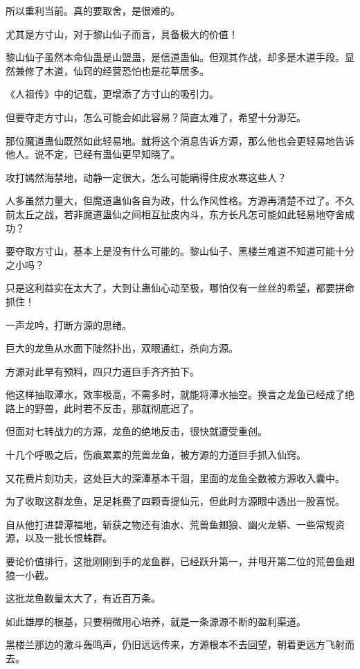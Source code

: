 \begin{this_body}
所以重利当前。真的要取舍，是很难的。

尤其是方寸山，对于黎山仙子而言，具备极大的价值！

黎山仙子虽然本命仙蛊是山盟蛊，是信道蛊仙。但观其作战，却多是木道手段。显然兼修了木道，仙窍的经营恐怕也是花草居多。

《人祖传》中的记载，更增添了方寸山的吸引力。

但要夺走方寸山，怎么可能会如此容易？简直太难了，希望十分渺茫。

那位魔道蛊仙既然如此轻易地。就将这个消息告诉方源，那么他也会更轻易地告诉他人。说不定，已经有蛊仙更早知晓了。

攻打嫣然海禁地，动静一定很大，怎么可能瞒得住皮水寒这些人？

人多虽然力量大，但魔道蛊仙各自为政，什么作风性格。方源再清楚不过了。不久前太丘之战，若非魔道蛊仙之间相互扯皮内斗，东方长凡怎可能如此轻易地夺舍成功？

要夺取方寸山，基本上是没有什么可能的。黎山仙子、黑楼兰难道不知道可能十分之小吗？

只是这利益实在太大了，大到让蛊仙心动至极，哪怕仅有一丝丝的希望，都要拼命抓住！

一声龙吟，打断方源的思绪。

巨大的龙鱼从水面下陡然扑出，双眼通红，杀向方源。

方源对此早有预料，四只力道巨手齐齐拍下。

他这样抽取潭水，效率极高，不需多时，就能将潭水抽空。换言之龙鱼已经成了绝路上的野兽，此时若不反击，那就彻底迟了。

但面对七转战力的方源，龙鱼的绝地反击，很快就遭受重创。

十几个呼吸之后，伤痕累累的荒兽龙鱼，被方源的力道巨手抓入仙窍。

又花费片刻功夫，这处巨大的深潭基本干涸，里面的龙鱼全数被方源收入囊中。

为了收取这群龙鱼，足足耗费了四颗青提仙元，但此时方源眼中透出一股喜悦。

自从他打进碧潭福地，斩获之物还有油水、荒兽鱼翅狼、幽火龙蟒、一些常规资源，以及一批长恨蛛群。

要论价值排行，这批刚刚到手的龙鱼群，已经跃升第一，并甩开第二位的荒兽鱼翅狼一小截。

这批龙鱼数量太大了，有近百万条。

如此雄厚的根基，只要稍微用心培养，就是一条源源不断的盈利渠道。

黑楼兰那边的激斗轰鸣声，仍旧远远传来，方源根本不去回望，朝着更远方飞射而去。


\end{this_body}
